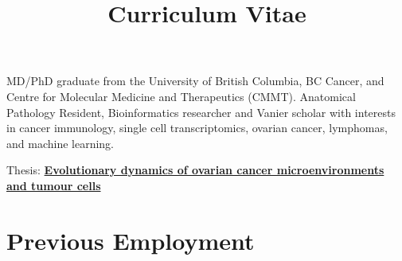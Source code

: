 \documentclass[11pt,a4paper,sans]{moderncv}        %
\title{Curriculum Vitae}                               %
\begin{document}
\makecvtitle

\small{MD/PhD graduate from the University of British Columbia, BC Cancer, and Centre for Molecular Medicine and Therapeutics (CMMT). Anatomical Pathology Resident, Bioinformatics researcher and Vanier scholar with interests in cancer immunology, single cell transcriptomics, ovarian cancer, lymphomas, and machine learning.}

\vspace{6pt}

\small{Thesis: \href{https://open.library.ubc.ca/cIRcle/collections/ubctheses/24/items/1.0379237}{\textbf{Evolutionary dynamics of ovarian cancer microenvironments and tumour cells}}}

\section{Previous Employment}

\vspace{6pt}
\end{document}
